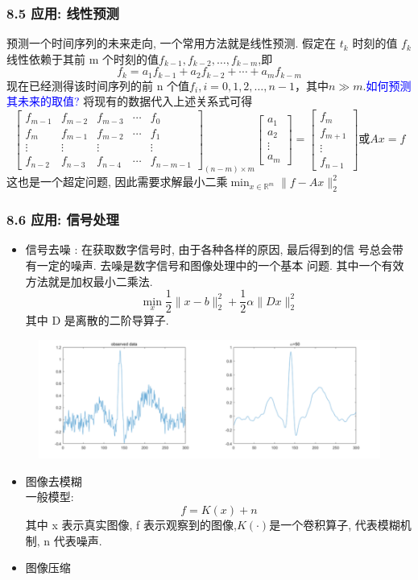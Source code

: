 \documentclass[notheorems,serif]{beamer}
\begin{document}
\begin{frame}
\frametitle{8.5 应用: 线性预测}
预测一个时间序列的未来走向, 一个常用方法就是线性预测. 假定在 $t_{k}$ 时刻的值 $f_{k}$ 线性依赖于其前 m 个时刻的值$f_{k-1}, f_{k-2}, \dots, f_{k-m}$,即
\begin{equation}
f_{k}=a_{1} f_{k-1}+a_{2} f_{k-2}+\cdots+a_{m} f_{k-m}
\end{equation}
现在已经测得该时间序列的前 n 个值$f_{i}, i=0,1,2, \ldots, n-1$，其中$n \gg m$.\textcolor{blue}{如何预测其未来的取值?}
将现有的数据代入上述关系式可得
$$
\left[\begin{array}{ccccc}
{f_{m-1}} & {f_{m-2}} & {f_{m-3}} & {\cdots} & {f_{0}} \\
{f_{m}} & {f_{m-1}} & {f_{m-2}} & {\cdots} & {f_{1}} \\ 
{\vdots} & {\vdots} & {\vdots} & {} & {\vdots} \\ 
{f_{n-2}} & {f_{n-3}} & {f_{n-4}} & {\cdots} & {f_{n-m-1}}
\end{array}\right]_{(n-m) \times m}\left[\begin{array}{c}
{a_{1}} \\
{a_{2}} \\
{\vdots} \\ 
{a_{m}}
\end{array}\right]=\left[\begin{array}{c}
{f_{m}} \\ 
{f_{m+1}} \\ 
{\vdots} \\ 
{f_{n-1}}
\end{array}\right]或A x=f
$$
这也是一个超定问题, 因此需要求解最小二乘$\min _{x \in \mathbb{R}^{m}}\|f-A x\|_{2}^{2}$
\end{frame}

\begin{frame}
\frametitle{8.6 应用: 信号处理}
\begin{itemize}
	\item 信号去噪 : 在获取数字信号时, 由于各种各样的原因, 最后得到的信 号总会带有一定的噪声. 去噪是数字信号和图像处理中的一个基本 问题. 其中一个有效方法就是加权最小二乘法.
	$$
	\min _{x} \frac{1}{2}\|x-b\|_{2}^{2}+\frac{1}{2} \alpha\|D x\|_{2}^{2}
	$$
	其中 D 是离散的二阶导算子.
\end{itemize}
	\begin{figure}[htbp]
		\begin{center}
            \includegraphics[scale=0.5]{figures/3-3.png}
		\end{center}
	\end{figure}
\end{frame}

\begin{frame}
\begin{itemize}
	\item 图像去模糊\\
	一般模型:
	$$
	f=K(x)+n
	$$
	其中 x 表示真实图像, f 表示观察到的图像,$K(\cdot)$是一个卷积算子, 代表模糊机制, n 代表噪声.
	\item 图像压缩
\end{itemize}
\end{frame}
\end{document}
